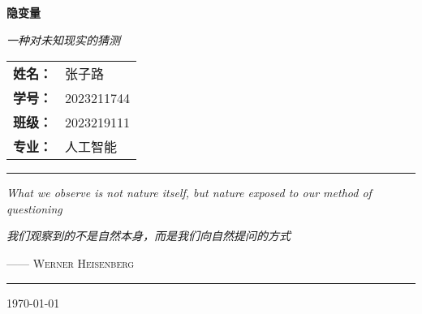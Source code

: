 
\begin{titlepage}
    \centering
    \vspace*{2.5cm}

    {\LARGE\bfseries 隐变量 \par}
    \vspace{0.8cm}
    {\large\itshape 一种对未知现实的猜测\par}

    \vspace{2.5cm}    %
    \begin{center}
        \begin{tabular}{ll}
            \textbf{姓名：} & 张子路 \\[0.5em]
            \textbf{学号：} & 2023211744 \\[0.5em]
            \textbf{班级：} & 2023219111 \\[0.5em]
            \textbf{专业：} & 人工智能\\[0.5em]
        \end{tabular}
          \vspace{1cm}
    \end{center}

    \vspace{3cm}
    \begin{center}
    \rule{0.6\textwidth}{0.5pt}

    \vspace{0.8cm}
    {\large\textit{What we observe is not nature itself, but nature exposed to our method of questioning}}

    \vspace{0.6cm}
    {\large\textit{我们观察到的不是自然本身，而是我们向自然提问的方式}}

    \vspace{0.5cm}
    \textsc{—— Werner Heisenberg}

    \vspace{0.8cm}
    \rule{0.6\textwidth}{0.5pt}
    \end{center}

    \vfill

    {\normalsize\today\par}
\end{titlepage}